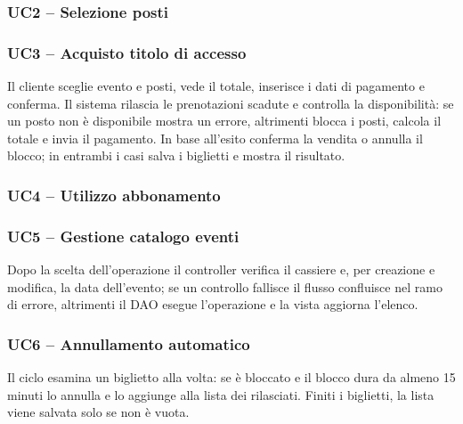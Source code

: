 \subsubsection{UC2 -- Selezione posti}

\subsubsection{UC3 -- Acquisto titolo di accesso}
Il cliente sceglie evento e posti, vede il totale, inserisce i dati di pagamento e conferma. Il sistema rilascia le prenotazioni scadute e controlla la disponibilità: se un posto non è disponibile mostra un errore, altrimenti blocca i posti, calcola il totale e invia il pagamento. In base all'esito conferma la vendita o annulla il blocco; in entrambi i casi salva i biglietti e mostra il risultato.

\subsubsection{UC4 -- Utilizzo abbonamento}

\subsubsection{UC5 -- Gestione catalogo eventi}
Dopo la scelta dell'operazione il controller verifica il cassiere e, per creazione e modifica, la data dell'evento; se un controllo fallisce il flusso confluisce nel ramo di errore, altrimenti il DAO esegue l'operazione e la vista aggiorna l'elenco.

\subsubsection{UC6 -- Annullamento automatico}
Il ciclo esamina un biglietto alla volta: se è bloccato e il blocco dura da almeno 15 minuti lo annulla e lo aggiunge alla lista dei rilasciati. Finiti i biglietti, la lista viene salvata solo se non è vuota.
